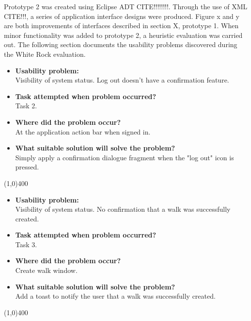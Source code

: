 \documentclass[11pt,a4paper]{article}
\begin{document}
Prototype 2 was created using Eclipse ADT CITE!!!!!!!!. Through the use of XML CITE!!!, a series of application interface designs were produced. Figure x and y are both improvements of interfaces described in section X, prototype 1. When minor functionality was added to prototype 2, a heuristic evaluation was carried out. The following section documents the usability problems discovered during the White Rock evaluation.

\begin{itemize}
	\item\textbf{Usability problem:}\\
	Visibility of system status. Log out doesn't have a confirmation feature.

	\item\textbf{Task attempted when problem occurred?}\\
	Task 2.

	\item\textbf{Where did the problem occur?}\\
	At the application action bar when signed in.

	\item\textbf{What suitable solution will solve the problem?}\\
	Simply apply a confirmation dialogue fragment when the "log out" icon is pressed.

\end{itemize}

\line(1,0){400}

\begin{itemize}
	\item\textbf{Usability problem:}\\
	Visibility of system status. No confirmation that a walk was successfully created.

	\item\textbf{Task attempted when problem occurred?}\\
	Task 3.

	\item\textbf{Where did the problem occur?}\\
	Create walk window.

	\item\textbf{What suitable solution will solve the problem?}\\
	Add a toast to notify the user that a walk was successfully created.

\end{itemize}

\line(1,0){400}
\end{document}
